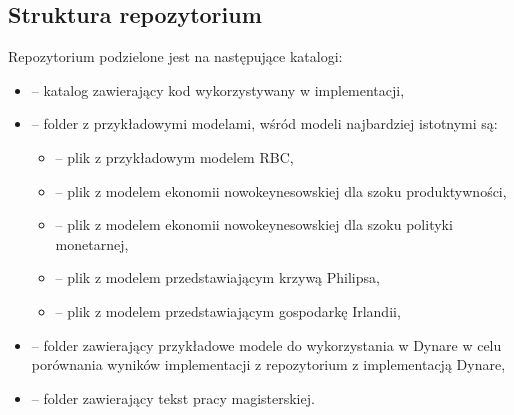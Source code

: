 \subsection{Struktura repozytorium}

Repozytorium podzielone jest na następujące katalogi:
\begin{itemize}
    \item {} -- katalog zawierający kod wykorzystywany w implementacji,
    \item {} -- folder z przykładowymi modelami, wśród modeli najbardziej istotnymi są:
        \begin{itemize}
            \item {} -- plik z przykładowym modelem RBC,
            \item {} -- plik z modelem ekonomii nowokeynesowskiej dla szoku produktywności,
            \item {} -- plik z modelem ekonomii nowokeynesowskiej dla szoku polityki monetarnej,
            \item {} -- plik z modelem przedstawiającym krzywą Philipsa,
            \item {} -- plik z modelem przedstawiającym gospodarkę Irlandii,
        \end{itemize}
    \item {} -- folder zawierający przykładowe modele do wykorzystania w Dynare w celu porównania wyników implementacji z repozytorium z implementacją Dynare,
    \item {} -- folder zawierający tekst pracy magisterskiej.
\end{itemize}

